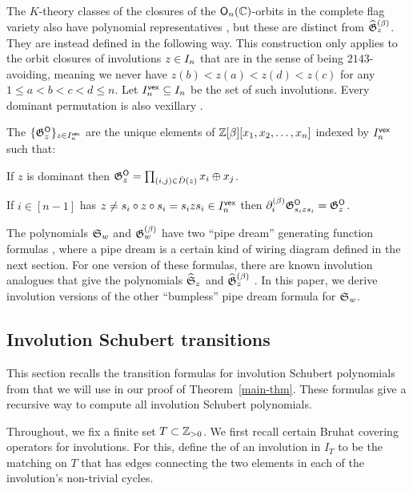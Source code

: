 \documentclass[10pt]{article}
\begin{document}
The $K$-theory classes of the closures of the $\mathsf{O}_n(\mathbb{C})$-orbits in the complete flag variety also have polynomial representatives \cite{MarPawK},
but these are distinct from  $\widehat{\mathfrak{G}}^{(\beta)}_z$. They are instead defined in the following way.
This construction only applies 
to the orbit closures of involutions $z \in I_n $ that 
are
 in the sense of being $2143$-avoiding,
meaning we never have $z(b)<z(a) < z(d)<z(c)$ 
for any $1\leq a<b<c<d\leq n$.
Let $I^{\mathsf{vex}}_n\subseteq I_n$ be the set of such involutions. 
Every dominant permutation is also vexillary \cite[\S2.2.1]{Manivel}.

\begin{definition}
The  $\{\mathfrak{G}^{\mathsf{O}}_z\}_{z\in I^{\mathsf{vex}}_n}$
are the unique elements of $\mathbb{Z}[\beta][x_1,x_2,\dots,x_n]$ indexed by $I^{\mathsf{vex}}_n $ such that:
\ben
\item[(a)] If $z$ is dominant then $\mathfrak{G}^{\mathsf{O}}_z = \prod_{(i,j) \in \hat D(z)} x_i \oplus x_j$.
\item[(b)] If $i \in [n-1]$ has $z\neq  s_i \circ z \circ s_i = s_iz s_i  \in I^{\mathsf{vex}}_n$ then $\partial^{(\beta)}_i \mathfrak{G}^{\mathsf{O}}_{s_i  z  s_i} = \mathfrak{G}^{\mathsf{O}}_{z}$.
\een
\end{definition}


The polynomials $\mathfrak S_w$ and $\mathfrak{G}^{(\beta)}_w$ have two  ``pipe dream'' generating function formulas \cite{BJS,LLS},
 where a pipe dream is a certain kind of wiring diagram defined in the next section.
 For one version of these formulas, there are known involution analogues that give the polynomials $\widehat{\mathfrak S}_z$ and $\widehat{\mathfrak{G}}^{(\beta)}_z$ \cite{HMP6,MarbergPawlowski}.
In this paper, we derive involution versions of the other ``bumpless'' pipe dream formula for $\mathfrak S_w$.

\subsection{Involution Schubert transitions}
\label{SS: involution transition}


This section recalls the transition formulas for involution Schubert polynomials from \cite{HMP3} that we will use in our proof of Theorem~\ref{main-thm}.
These formulas give a recursive
way to compute all 
involution Schubert polynomials.

Throughout, we fix a finite set $T \subset \mathbb{Z}_{>0}$.
We first recall certain Bruhat covering operators for involutions.
For this, define the  of an involution in $I_T$ to be the matching on $T$ that has edges connecting the two elements in each of the involution's non-trivial cycles.
\end{document}
